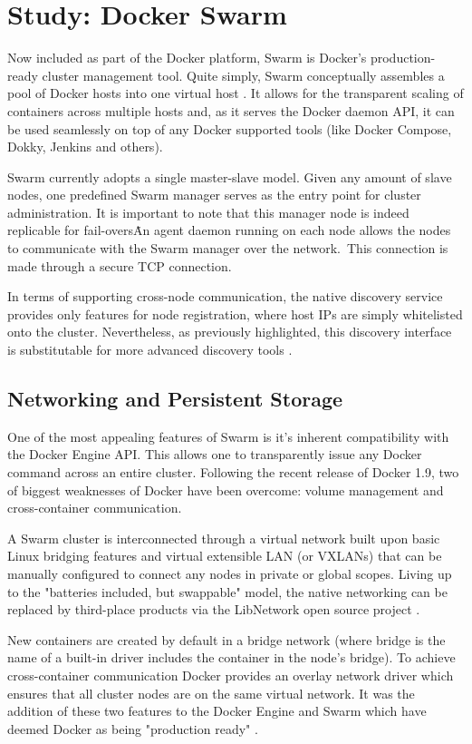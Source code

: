 \documentclass{article}
\begin{document}
\section{Study: Docker Swarm}
Now included as part of the Docker platform, Swarm is Docker's production-ready cluster management tool.  Quite simply, Swarm conceptually assembles a pool of Docker hosts into one virtual host \citep{swarm_manual}. It allows for the transparent scaling of containers across multiple hosts and, as it serves the Docker daemon API, it can be used seamlessly on top of any Docker supported tools (like Docker Compose, Dokky, Jenkins and others).
\par
Swarm currently adopts a single master-slave model. Given any amount of slave nodes, one predefined Swarm manager serves as the entry point for cluster administration. It is important to note that this manager node is indeed replicable for fail-overs\.
An agent daemon running on each node allows the nodes to communicate with the Swarm manager over the network.\ This connection is made through a secure TCP connection. 
\par
In terms of supporting cross-node communication, the native discovery service provides only features for node registration, where host IPs are simply whitelisted onto the cluster. Nevertheless, as previously highlighted, this discovery interface is substitutable for more advanced discovery tools \citep{holla}. 

\subsection{Networking and Persistent Storage}
One of the most appealing features of Swarm is it's inherent compatibility with the Docker Engine API. This allows one to transparently issue any Docker command across an entire cluster. Following the recent release of Docker 1.9, two of biggest weaknesses of Docker have been overcome: volume management and cross-container communication.
\par
A Swarm cluster is interconnected through a virtual network built upon basic Linux bridging features and virtual extensible LAN (or VXLANs) that can be manually configured to connect any nodes in private or global scopes. Living up to the "batteries included, but swappable" model, the native networking can be replaced by third-place products via the LibNetwork open source project \citep{Butler}.
\par
New containers are created by default in a bridge network (where bridge is the name of a built-in driver includes the container in the node's bridge). To achieve cross-container communication Docker provides an overlay network driver which ensures that all cluster nodes are on the same virtual network. It was the addition of these two features to the Docker Engine and Swarm which have deemed Docker as being "production ready" \citep{milestone}.
\end{document}
